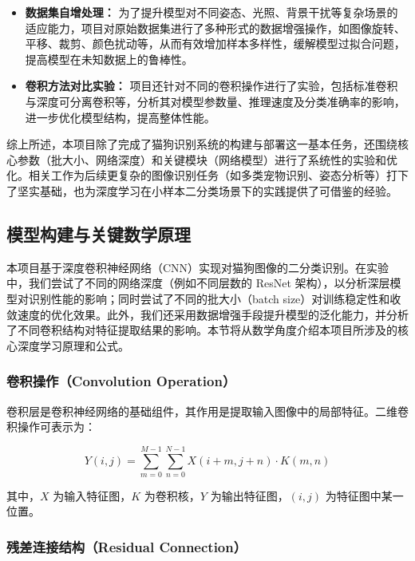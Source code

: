 \documentclass[10.5pt,compsoc]{CjC}
\theoremstyle{mystyle}
\begin{document}
\begin{CJK*}{GBK}{song}
\begin{itemize}
  \item \textbf{数据集自增处理：} 为了提升模型对不同姿态、光照、背景干扰等复杂场景的适应能力，项目对原始数据集进行了多种形式的数据增强操作，如图像旋转、平移、裁剪、颜色扰动等，从而有效增加样本多样性，缓解模型过拟合问题，提高模型在未知数据上的鲁棒性。
  
  \item \textbf{卷积方法对比实验：} 项目还针对不同的卷积操作进行了实验，包括标准卷积与深度可分离卷积等，分析其对模型参数量、推理速度及分类准确率的影响，进一步优化模型结构，提高整体性能。
\end{itemize}

综上所述，本项目除了完成了猫狗识别系统的构建与部署这一基本任务，还围绕核心参数（批大小、网络深度）和关键模块（网络模型）进行了系统性的实验和优化。相关工作为后续更复杂的图像识别任务（如多类宠物识别、姿态分析等）打下了坚实基础，也为深度学习在小样本二分类场景下的实践提供了可借鉴的经验。



{\begin{CJK*}{GBK}{hei}\subsection{模型构建与关键数学原理}\end{CJK*}}

本项目基于深度卷积神经网络（CNN）实现对猫狗图像的二分类识别。在实验中，我们尝试了不同的网络深度（例如不同层数的 ResNet 架构），以分析深层模型对识别性能的影响；同时尝试了不同的批大小（batch size）对训练稳定性和收敛速度的优化效果。此外，我们还采用数据增强手段提升模型的泛化能力，并分析了不同卷积结构对特征提取结果的影响。本节将从数学角度介绍本项目所涉及的核心深度学习原理和公式。

\subsubsection{卷积操作（Convolution Operation）}

卷积层是卷积神经网络的基础组件，其作用是提取输入图像中的局部特征。二维卷积操作可表示为：

\begin{equation}
Y(i, j) = \sum_{m=0}^{M-1} \sum_{n=0}^{N-1} X(i+m, j+n) \cdot K(m, n)
\end{equation}

其中，$X$ 为输入特征图，$K$ 为卷积核，$Y$ 为输出特征图，$(i,j)$ 为特征图中某一位置。

\subsubsection{残差连接结构（Residual Connection）}


\end{CJK*}
\end{document}
